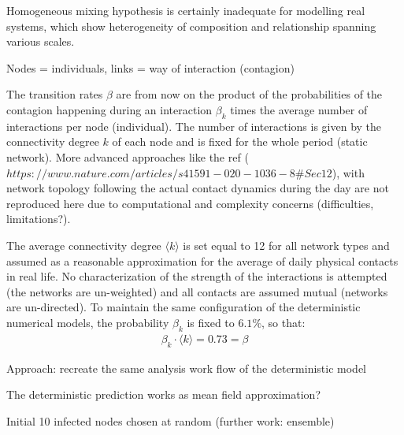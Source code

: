 \documentclass[DIV=12, BCOR=0pt]{scrartcl}  %
\begin{document}
  Homogeneous mixing hypothesis is certainly inadequate for modelling real systems, which show heterogeneity of composition and relationship spanning various scales. 
  
  Nodes = individuals, links = way of interaction (contagion)
  
  The transition rates $\beta$ are from now on the product of the probabilities of the contagion happening during an interaction $\beta_k$ times the average number of interactions per node (individual). The number of interactions is given by the connectivity degree $k$ of each node and is fixed for the whole period (static network). More advanced approaches like the ref ($https://www.nature.com/articles/s41591-020-1036-8\#Sec12$), with network topology following the actual contact dynamics during the day are not reproduced here due to computational and complexity concerns (difficulties, limitations?).
  
  The average connectivity degree $\langle k \rangle$ is set equal to 12 for all network types and assumed as a reasonable approximation for the average of daily physical contacts in real life. No characterization of the strength of the interactions is attempted (the networks are un-weighted) and all contacts are assumed mutual (networks are un-directed). To maintain the same configuration of the deterministic numerical models, the probability $\beta_k$ is fixed to $6.1 \%$, so that:
  \begin{align}
			\beta_k \cdot \langle k \rangle = 0.73 = \beta
  \end{align}
  
  
  
  Approach: recreate the same analysis work flow of the deterministic model

  
  The deterministic prediction works as mean field approximation?
%  
%  
  
  Initial 10 infected nodes chosen at random (further work: ensemble)
  
\end{document}
